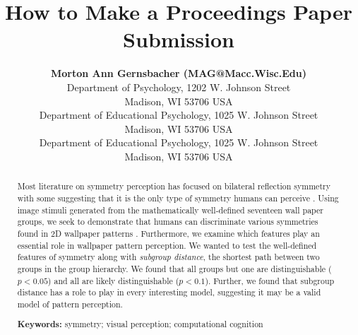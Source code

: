\documentclass[10pt,letterpaper]{article}
\title{How to Make a Proceedings Paper Submission}
\author{{\large \bf Morton Ann Gernsbacher (MAG@Macc.Wisc.Edu)} \\
  Department of Psychology, 1202 W. Johnson Street \\
  Madison, WI 53706 USA
  \AND {\large \bf Sharon J.~Derry (SDJ@Macc.Wisc.Edu)} \\
  Department of Educational Psychology, 1025 W. Johnson Street \\
  Madison, WI 53706 USA
   \AND {\large \bf Sharon J.~Derry (SDJ@Macc.Wisc.Edu)} \\
    Department of Educational Psychology, 1025 W. Johnson Street \\
    Madison, WI 53706 USA}
\newcommand{\citep}[1]{\cite{#1}}
\begin{document}
\maketitle


\begin{abstract}
Most literature on symmetry perception has focused on bilateral reflection symmetry with some suggesting that it is the only type of symmetry humans can perceive \citep{bio}. Using image stimuli generated from the mathematically well-defined seventeen wall paper groups, we seek to demonstrate that humans can discriminate various symmetries found in 2D wallpaper patterns \citep{yanxitrends}. Furthermore, we examine which features play an essential role in wallpaper pattern perception. We wanted to test the well-defined features of symmetry along with \textit{subgroup distance}, the shortest path between two groups in the group hierarchy. We found that all groups but one are distinguishable ($p<0.05$) and all are likely distinguishable ($p<0.1$). Further, we found that subgroup distance has a role to play in every interesting model, suggesting it may be a valid model of pattern perception.

\textbf{Keywords:} 
symmetry; visual perception; computational cognition
\end{abstract}












\setlength{\bibleftmargin}{.125in}
\setlength{\bibindent}{-\bibleftmargin}


\end{document}
